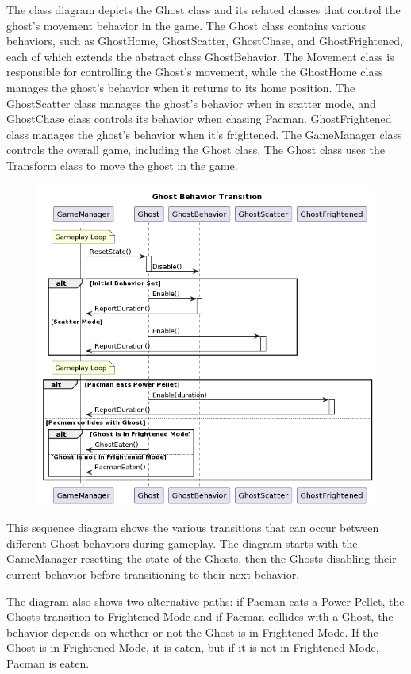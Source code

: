\documentclass[11pt]{article}
\begin{document}
The class diagram depicts the Ghost class and its related classes that control the ghost's movement behavior in the game. The Ghost class contains various behaviors, such as GhostHome, GhostScatter, GhostChase, and GhostFrightened, each of which extends the abstract class GhostBehavior. The Movement class is responsible for controlling the Ghost's movement, while the GhostHome class manages the ghost's behavior when it returns to its home position. The GhostScatter class manages the ghost's behavior when in scatter mode, and GhostChase class controls its behavior when chasing Pacman. GhostFrightened class manages the ghost's behavior when it's frightened. The GameManager class controls the overall game, including the Ghost class. The Ghost class uses the Transform class to move the ghost in the game.

\begin{figure}[H]
    \centering
    \includegraphics*[scale=0.4]{Ghost_Sequence.png}
\end{figure}

This sequence diagram shows the various transitions that can occur between different Ghost behaviors during gameplay. The diagram starts with the GameManager resetting the state of the Ghosts, then the Ghosts disabling their current behavior before transitioning to their next behavior.

The diagram also shows two alternative paths: if Pacman eats a Power Pellet, the Ghosts transition to Frightened Mode and if Pacman collides with a Ghost, the behavior depends on whether or not the Ghost is in Frightened Mode. If the Ghost is in Frightened Mode, it is eaten, but if it is not in Frightened Mode, Pacman is eaten.
\end{document}

